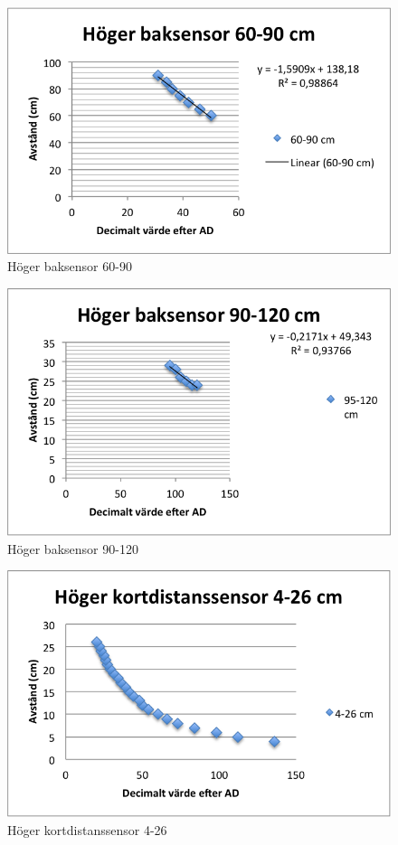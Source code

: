 \begin{figure}[H]
  \centering
 \includegraphics[angle=0,scale=1]{bilder/HB_60_90.png}
  \caption{Höger baksensor 60-90}
\end{figure}

\begin{figure}[H]
  \centering
 \includegraphics[angle=0,scale=1]{bilder/HB_90_120.png}
  \caption{Höger baksensor 90-120}
\end{figure}

\begin{figure}[H]
  \centering
 \includegraphics[angle=0,scale=1]{bilder/H_K_4_26.png}
  \caption{Höger kortdistanssensor 4-26}
\end{figure}

